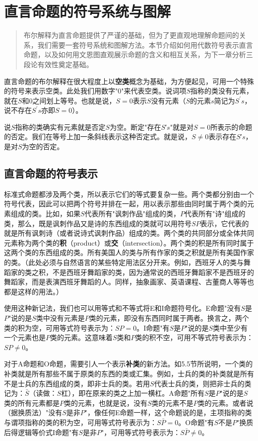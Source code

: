 \section{直言命题的符号系统与图解}

\begin{quotation}
布尔解释为直言命题提供了严谨的基础，但为了更直观地理解命题间的关系，我们需要一套符号系统和图解方法。本节介绍如何用代数符号表示直言命题，以及如何用文恩图直观展示命题的含义和相互关系，为下一章分析三段论有效性奠定基础。
\end{quotation}

直言命题的布尔解释在很大程度上以\textbf{空类}概念为基础，为方便起见，可用一个特殊的符号来表示空类。此处我们用数字"0"来代表空类。说词项$S$指称的类没有元素，就在$S$和0之间划上等号。也就是说，$S=0$表示$S$没有元素（$S$的元素$s$简记为$S^{\prime}s$，说不存在$S^{\prime}s$亦即$S=0$）。

说$S$指称的类确实有元素就是否定$S$为空。断定"存在$S$′$s$"就是对$S=0$所表示的命题的否定。我们在等号上加一条斜线表示这种否定式。就是说，$S \neq 0$表示存在$S$′$s$，是对$S$为空的否定。

\subsection{直言命题的符号表示}

标准式命题都涉及两个类，所以表示它们的等式要复杂一些。两个类都分别由一个符号代表，因此可以把两个符号并排在一起，用以表示那些由同时属于两个类的元素组成的类。比如，如果$S$代表所有"讽刺作品"组成的类，$P$代表所有"诗"组成的类，那么，既是讽刺作品又是诗的东西组成的类就可以用符号$SP$表示，它代表的就是所有讽刺诗（或者说诗式讽刺作品）组成的类。两个类的共同部分或全体共同元素称为两个类的\textbf{积}（product）或\textbf{交}（intersection）。两个类的积是所有同时属于这两个类的东西组成的类。所有美国人的类与所有作家的类之积就是所有美国作家的类。（此处必须与自然语言的某些特定用法区分开来。例如，西班牙人的类与舞蹈家的类之积，不是西班牙舞蹈家的类，因为通常说的西班牙舞蹈家不是西班牙的舞蹈家，而是表演西班牙舞蹈的人。同样，抽象画家、英语课程、古董商人等等也都是这样的用法。）

使用这种新记法，我们也可以用等式和不等式将E和I命题符号化。E命题"没有$S$是$P$"说的是$S$类中没有元素是$P$类的元素，即没有东西同时属于两者。换言之，两个类的积为空，可用等式符号表示为：$SP=0$。I命题"有$S$是$P$"说的是$S$类中至少有一个元素也是$P$类的元素。这意味着$S$类和$P$类的积不空，可用不等式符号表示为：$SP \neq 0$。

对于A命题和O命题，需要引人一个表示\textbf{补类}的新方法。如5.5节所说明，一个类的补类就是所有那些不属于原类的东西的类或汇集。例如，士兵的类的补类就是所有不是士兵的东西组成的类，即非士兵的类。若用$S$代表士兵的类，则把非士兵的类记为：$\bar{S}$（读做：$S$杠），即在原来的类之上加一横杠。A命题"所有$S$是$P$"说的是$S$类的所有元素都是$P$类的元素，也就是说，没有$S$类的元素不是$P$类的元素。或者说（据换质法）"没有$S$是非$P$"，像任何E命题一样，这个命题说的是，主项指称的类与谓项指称的类的积为空，可用等式符号表示为：$S\bar{P}=0$。O命题"有$S$不是$P$"换质后得逻辑等价式I命题"有$S$是非$P$"，可用等式符号表示为：$S\bar{P} \neq 0$。

